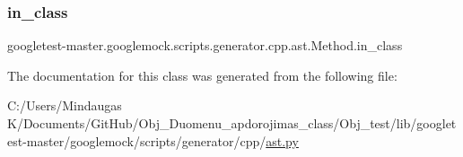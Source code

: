 \subsubsection{\texorpdfstring{in\_class}{in\_class}}
{\footnotesize\ttfamily googletest-\/master.\+googlemock.\+scripts.\+generator.\+cpp.\+ast.\+Method.\+in\+\_\+class}



The documentation for this class was generated from the following file\+:\begin{DoxyCompactItemize}
\item 
C\+:/\+Users/\+Mindaugas K/\+Documents/\+Git\+Hub/\+Obj\+\_\+\+Duomenu\+\_\+apdorojimas\+\_\+class/\+Obj\+\_\+test/lib/googletest-\/master/googlemock/scripts/generator/cpp/\mbox{\hyperlink{_obj__test_2lib_2googletest-master_2googlemock_2scripts_2generator_2cpp_2ast_8py}{ast.\+py}}\end{DoxyCompactItemize}
